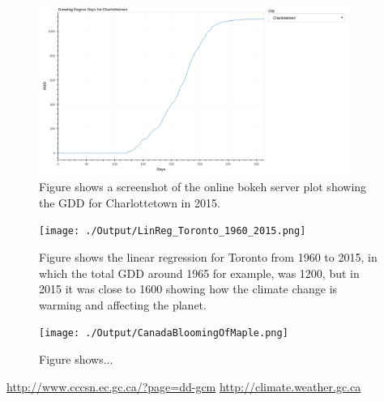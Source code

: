 \documentclass[12pt]{article}
\begin{document}
	\begin{figure}[!htbp]
		\centering
		\includegraphics[width=0.9\textwidth]{./Report/bokeh_serve_screenshot.png} 
		\caption{\scriptsize Figure shows a screenshot of the online bokeh server plot showing the
		GDD for Charlottetown in 2015.}\label{BokehServer}		  
	\end{figure}
	
	\begin{figure}[!htbp]
		\centering
		\texttt{[image: ./Output/LinReg\_Toronto\_1960\_2015.png]} 
		\caption{\scriptsize Figure shows the linear regression for Toronto from 1960 to 2015, 
		in which the total GDD around 1965 for example, was 1200, but in 2015 it was close to 
		1600 showing how the climate change is warming and affecting the planet.}\label{LinReg}		  
	\end{figure}

	\begin{figure}[!htbp]
		\centering
		\texttt{[image: ./Output/CanadaBloomingOfMaple.png]} 
		\caption{\scriptsize Figure shows...}\label{gddMapCaMaple}		  
	\end{figure}

\pagebreak
\begin{thebibliography}{2}
\url{http://www.cccsn.ec.gc.ca/?page=dd-gcm}
\url{http://climate.weather.gc.ca}
\end{thebibliography}
\end{document}

